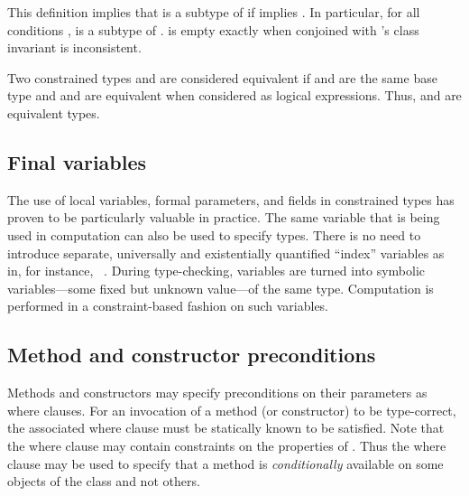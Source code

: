 
This definition 
implies that
 is a subtype of  if  implies .
In particular, for all conditions ,
 is a subtype of .
 is empty exactly
when  conjoined with 's class invariant is inconsistent.

Two constrained types  and  are considered
equivalent if  and  are the same base type and
 and  are equivalent when considered as logical
expressions. Thus,  and  are
equivalent types.

\subsection{Final variables}

The use of  local variables, formal parameters, and
fields in constrained
types has proven to be particularly valuable in practice. The same
variable that is being used in computation can also be used to specify
types. There is no need to introduce separate, universally and
existentially quantified ``index'' variables as in, for
instance, \DML{}~\cite{xi99dependent}.
%
During type-checking,  variables are turned into symbolic
variables---some fixed but unknown value---of the same type.
Computation is performed in a constraint-based fashion on such
variables.

\subsection{Method and constructor preconditions}

Methods and constructors may specify preconditions on their parameters
as where clauses.  For an invocation of a method (or constructor) to
be type-correct, the associated where clause must be statically known
to be satisfied. Note that the where clause may contain constraints on
the properties of . Thus the where clause may be used to
specify that a method is {\em conditionally} available on some objects
of the class and not others.

